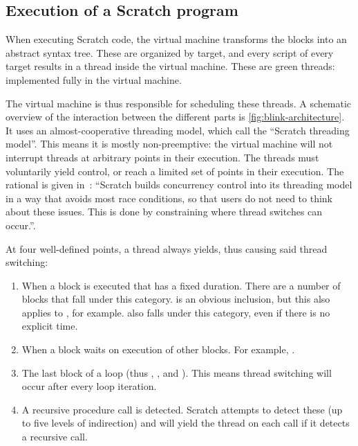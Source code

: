 \documentclass[../main]{subfiles}
\begin{document}
\subsection{Execution of a Scratch program}\label{subsec:execution-of-a-scratch-program}

When executing Scratch code, the virtual machine transforms the blocks into an abstract syntax tree.
These are organized by target, and every script of every target results in a thread inside the virtual machine.
These are green threads: implemented fully in the virtual machine.

The virtual machine is thus responsible for scheduling these threads.
A schematic overview of the interaction between the different parts is \cref{fig:blink-architecture}.
It uses an almost-cooperative threading model, which \textcite{maloneyScratchProgrammingLanguage2010a} call the ``Scratch threading model''.
This means it is mostly non-preemptive: the virtual machine will not interrupt threads at arbitrary points in their execution.
The threads must voluntarily yield control, or reach a limited set of points in their execution.
The rational is given in~\cite{maloneyScratchProgrammingLanguage2010a}: ``Scratch builds concurrency control into its threading model in a way that avoids most race conditions, so that users do not need to think about these issues.
This is done by constraining where thread switches can occur.''.

At four well-defined points, a thread always yields, thus causing said thread switching:
\begin{enumerate}
    \item When a block is executed that has a fixed duration.
        There are a number of blocks that fall under this category.
         is an obvious inclusion, but this also applies to , for example.
         also falls under this category, even if there is no explicit time.
    \item When a block waits on execution of other blocks.
        For example, .
    \item The last block of a loop (thus , , and ).
        This means thread switching will occur after every loop iteration.
    \item A recursive procedure call is detected.
        Scratch attempts to detect these (up to five levels of indirection) and will yield the thread on each call if it detects a recursive call.
\end{enumerate}
\end{document}
